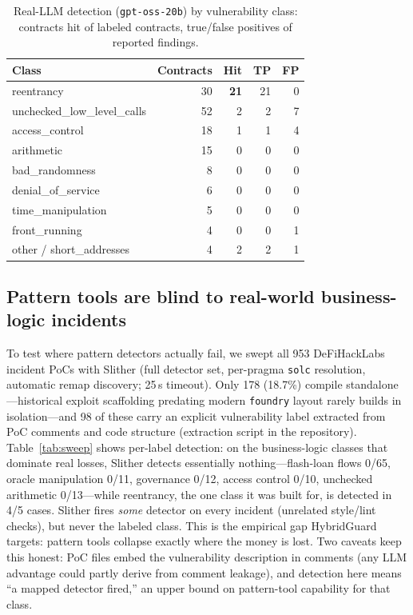 \documentclass[conference]{IEEEtran}
\newcommand{\system}{HybridGuard}
\begin{document}
\begin{table}[t]
\centering
\caption{Real-LLM detection (\texttt{gpt-oss-20b}) by vulnerability class: contracts hit of
labeled contracts, true/false positives of reported findings.}
\label{tab:classwise}
\begin{tabular}{lrrrr}
\toprule
Class & Contracts & Hit & TP & FP \\
\midrule
reentrancy                & 30 & \textbf{21} & 21 & 0 \\
unchecked\_low\_level\_calls & 52 & 2  & 2  & 7 \\
access\_control             & 18 & 1  & 1  & 4 \\
arithmetic                  & 15 & 0  & 0  & 0 \\
bad\_randomness              & 8  & 0  & 0  & 0 \\
denial\_of\_service           & 6  & 0  & 0  & 0 \\
time\_manipulation           & 5  & 0  & 0  & 0 \\
front\_running               & 4  & 0  & 0  & 1 \\
other / short\_addresses     & 4  & 2  & 2  & 1 \\
\bottomrule
\end{tabular}
\end{table}

\subsection{Pattern tools are blind to real-world business-logic incidents}\label{sec:sweep}
To test where pattern detectors actually fail, we swept all 953 DeFiHackLabs incident PoCs with
Slither (full detector set, per-pragma \texttt{solc} resolution, automatic remap discovery;
25\,s timeout). Only 178 (18.7\%) compile standalone---historical exploit scaffolding predating
modern \texttt{foundry} layout rarely builds in isolation---and 98 of these carry an explicit
vulnerability label extracted from PoC comments and code structure
(extraction script in the repository). Table~\ref{tab:sweep} shows per-label detection: on the business-logic
classes that dominate real losses, Slither detects essentially nothing---flash-loan flows 0/65,
oracle manipulation 0/11, governance 0/12, access control 0/10, unchecked arithmetic 0/13---while
reentrancy, the one class it was built for, is detected in 4/5 cases. Slither fires \emph{some}
detector on every incident (unrelated style/lint checks), but never the labeled class. This is the
empirical gap \system{} targets: pattern tools collapse exactly where the money is lost. Two caveats
keep this honest: PoC files embed the vulnerability description in comments (any LLM advantage
could partly derive from comment leakage), and detection here means ``a mapped detector fired,'' an
upper bound on pattern-tool capability for that class.
\end{document}

